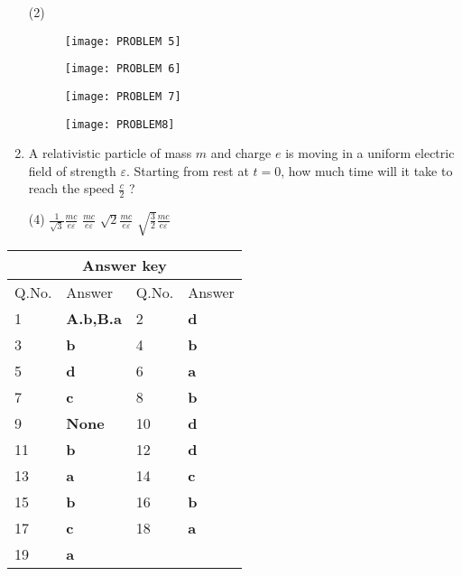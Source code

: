 \begin{enumerate}
	{}
\begin{tasks}(2)
	\task[\textbf{A.}]\begin{figure}[H]
		\centering
		\texttt{[image: PROBLEM 5]}
	\end{figure}
	\task[\textbf{B.}]\begin{figure}[H]
		\centering
		\texttt{[image: PROBLEM 6]}
	\end{figure}
	\task[\textbf{C.}]\begin{figure}[H]
		\centering
		\texttt{[image: PROBLEM 7]}
	\end{figure}
	\task[\textbf{D.}]\begin{figure}[H]
		\centering
		\texttt{[image: PROBLEM8]}
	\end{figure}
\end{tasks}
	\item A relativistic particle of mass $m$ and charge $e$ is moving in a uniform electric field of strength $\varepsilon$. Starting from rest at $t=0$, how much time will it take to reach the speed $\frac{c}{2}$ ?
	{}
\begin{tasks}(4)
	\task[\textbf{A.}] $\frac{1}{\sqrt{3}} \frac{m c}{e \varepsilon}$
	\task[\textbf{B.}]$\frac{m c}{e \varepsilon}$
	\task[\textbf{C.}]$\sqrt{2} \frac{m c}{e \varepsilon}$
	\task[\textbf{D.}]$\sqrt{\frac{3}{2}} \frac{m c}{e \varepsilon}$
\end{tasks}
\end{enumerate}
\setlength\arrayrulewidth{1pt}
\begin{table}[H]
	\centering
	
	\begin{tabular}{|p{1.5cm}|p{1.5cm}||p{1.5cm}|p{1.5cm}|}
		\hline
		\multicolumn{4}{|c|}{\textbf{Answer key}}\\\hline\hline
		\rowcolor{ocrel}Q.No.&Answer&Q.No.&Answer\\\hline
		1&\textbf{A.b,B.a}&2&\textbf{d}\\\hline
		3&\textbf{b}&4&\textbf{b}\\\hline
		5&\textbf{d}&6&\textbf{a}\\\hline
		7&\textbf{c}&8&\textbf{b}\\\hline
		9&\textbf{None}&10&\textbf{d}\\\hline
		11&\textbf{b}&12&\textbf{d}\\\hline
		13&\textbf{a}&14&\textbf{c}\\\hline
		15&\textbf{b}&16&\textbf{b}\\\hline
		17&\textbf{c}&18&\textbf{a}\\\hline
		19&\textbf{a}&&\\\hline
	\end{tabular}
\end{table}
